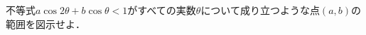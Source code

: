\documentclass[../../main.tex]{subfiles}
\begin{document}
不等式$a\cos2\theta+b\cos\theta<1$がすべての実数$\theta$について成り立つような点$(a,b)$の範囲を図示せよ．
\end{document}
